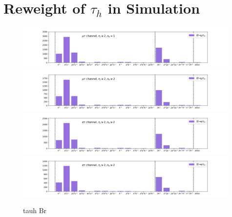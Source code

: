 \chapter{Reweight of \texorpdfstring{$\tau_h$}{Lg} in Simulation}


\begin{figure}
    \centering
    \includegraphics[width=0.99\textwidth]{appendices/tauhBrReweighting/figures/tauhDecay_mutau.png}
    \includegraphics[width=0.99\textwidth]{appendices/tauhBrReweighting/figures/tauhDecay_mutau2.png}
    \includegraphics[width=0.99\textwidth]{appendices/tauhBrReweighting/figures/tauhDecay_etau.png}
    \includegraphics[width=0.99\textwidth]{appendices/tauhBrReweighting/figures/tauhDecay_etau2.png}


    \caption{tauh Br}
    \label{fig:appendix:reweightTauhBr:tauhBr}
\end{figure}